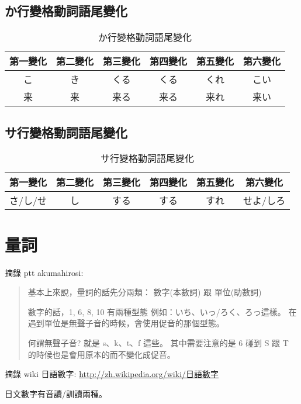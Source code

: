 \documentclass[12pt]{article}
\begin{document}
\begin{CJK}{UTF8}{nsung}
\subsection{か行變格動詞語尾變化}
\begin{table}[htdp]
\begin{tabular}{cccccc}
\hline
第一變化 & 第二變化 & 第三變化 & 第四變化 & 第五變化 & 第六變化 \\
\hline
こ & き & くる & くる & くれ& こい \\
来 & 来 & 来る & 来る & 来れ& 来い \\
\hline
\end{tabular}
\caption{か行變格動詞語尾變化}
\end{table}

\subsection{サ行變格動詞語尾變化}
\begin{table}[htdp]
\begin{tabular}{cccccc}
\hline
第一變化 & 第二變化 & 第三變化 & 第四變化 & 第五變化 & 第六變化 \\
\hline
さ/し/せ & し & する & する & すれ& せよ/しろ \\
\hline
\end{tabular}
\caption{サ行變格動詞語尾變化}
\end{table}

\section{量詞}

摘錄 ptt akumahirosi:
\begin{quote}
  基本上來說，量詞的話先分兩類： 數字(本數詞)  跟  單位(助數詞)

  數字的話，1, 6, 8, 10 有兩種型態
  例如：いち、いっ/ろく、ろっ這樣。
  在遇到單位是無聲子音的時候，會使用促音的那個型態。

  何謂無聲子音? 就是 s、k、t、f 這些。
  其中需要注意的是 6 碰到 S 跟 T 的時候也是會用原本的而不變化成促音。
\end{quote}

摘錄 wiki 日語數字: \href{http://zh.wikipedia.org/wiki/%E6%97%A5%E8%AA%9E%E6%95%B8%E5%AD%97}{http://zh.wikipedia.org/wiki/日語數字}

日文數字有音讀/訓讀兩種。


\end{CJK}
\end{document}
